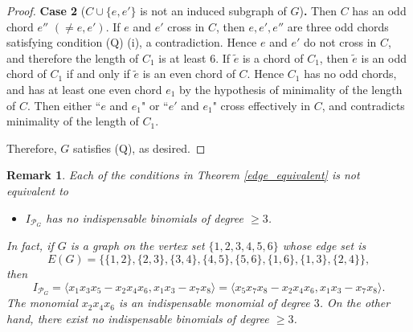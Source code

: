 \documentclass[10pt,a4paper]{amsart}
\newtheorem{Remark}[thm]{Remark}
\numberwithin{thm}{section}
\numberwithin{equation}{section}
\def\epoly{{\mathcal P}_G}
\begin{document}
\begin{proof}
\noindent
{\bf Case 2} ($C \cup \{e,e'\}$ is not an induced subgraph of $G$){\bf .}    
    Then $C$ has an odd chord $e''$ $(\ne e, e')$.  
    If $e$ and $e'$ cross in $C$, then $e,e',e''$ are three odd chords satisfying condition (Q) (i), a contradiction. Hence $e$ and $e'$ do not cross in $C$, and therefore
    the length of $C_1$ is at least $6$.
    If $\widetilde{e}$ is a chord of $C_1$, then $\widetilde{e}$ is an odd chord of $C_1$ if and only if $\widetilde{e}$ is an even chord of $C$.
    Hence $C_1$ has no odd chords, and has at least one even chord $e_1$
    by the hypothesis of minimality of the length of $C$.
    Then either ``$e$ and $e_1$" or ``$e'$ and $e_1$" cross effectively in $C$,
    and contradicts minimality of the length of $C_1$.

\bigskip

    Therefore, $G$ satisfies (Q), as desired.
\end{proof}

\begin{Remark} \label{not equiv}
    Each of the conditions in Theorem \ref{edge_equivalent} is \emph{not} equivalent to
    \begin{itemize}
        \item[(v)]
                $I_{\epoly}$ has no indispensable {\it binomials} of degree $\ge 3$.
    \end{itemize}
    In fact, if $G$ is a graph on the vertex set $\{1,2,3,4,5,6\}$ whose edge set is
    $$E(G)= \{ \{1,2\},\{ 2, 3\}, \{ 3,4\}, \{ 4, 5\}, \{ 5, 6\},\{ 1,6 \}, \{ 1, 3\}, \{ 2,4 \}   \},$$
    then
    \[
    I_{\epoly} = 
    \langle x_1x_3x_5- x_2x_4x_6, x_1 x_3 -x_7 x_8\rangle
    =\langle x_5x_7x_8- x_2x_4x_6, x_1 x_3 -x_7 x_8\rangle  
    .\]
    The monomial $x_2x_4x_6$ is an indispensable monomial of degree $3$.
    On the other hand, there exist no indispensable binomials of degree $\ge 3$.
\end{Remark}
    
\end{document}
